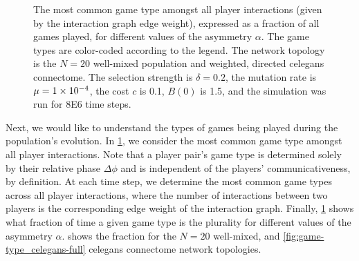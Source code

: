 \documentclass[pdflatex,lineno,referee,sn-mathphys-ay]{sn-jnl}
\begin{document}
\begin{figure}
  \caption{
    The most common game type amongst all player interactions
    (given by the interaction graph edge weight),
    expressed as a fraction of all games played,
    for different values of the asymmetry $\alpha$.
    The game types are color-coded according to the legend.
    The network topology is the
    $N=20$ well-mixed population
    and
    weighted, directed \gls{celegans} connectome.
    The selection strength is $\delta=0.2$,
    the mutation rate is $\mu=\num{1E-4}$,
    the cost $c$ is \num{0.1},
    $B(0)$ is \num{1.5},
    and the simulation was run for \num{8E6} time steps.
  }
  \label{fig:game-type}
\end{figure}

Next, we would like to understand the types of games being played
during the population's evolution.
In \cref{fig:game-type}, we consider the most common game type
amongst all player interactions.
Note that a player pair's game type is determined solely
by their relative phase $\Delta \phi$ and is independent
of the players' communicativeness, by definition.
At each time step, we determine the most common game types
across all player interactions,
where the number of interactions between two players
is the corresponding edge weight of the interaction graph.
Finally, \cref{fig:game-type} shows what fraction of time
a given game type is the plurality for different values
of the asymmetry $\alpha$.
shows the fraction for the
$N=20$ well-mixed,
and
\cref{fig:game-type_celegans-full}
\gls{celegans} connectome network topologies.
\end{document}
